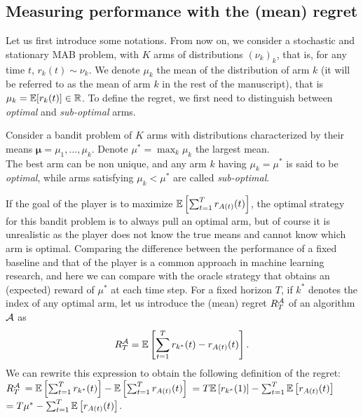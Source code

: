 \subsection{Measuring performance with the (mean) regret}

Let us first introduce some notations.
From now on, we consider a stochastic and stationary MAB problem, with $K$ arms of distributions $(\nu_k)_k$, that is, for any time $t$, $r_k(t)\sim \nu_k$.
We denote $\mu_k$ the mean of the distribution of arm $k$ (it will be referred to as the mean of arm $k$ in the rest of the manuscript), that is $\mu_k = \mathbb{E}[r_k(t)] \in \mathbb{R}$.
%
%
To define the regret, we first need to distinguish between \emph{optimal} and \emph{sub-optimal} arms.

\begin{defn}\label{def:2:optimalSubOptimalArms}
    Consider a bandit problem of $K$ arms with distributions characterized by their means $\bm{\mu}=\mu_1,\dots,\mu_k$.
    Denote $\mu^* = \max_k \mu_k$ the largest mean.\\
    The best arm can be non unique, and any arm $k$ having $\mu_k = \mu^*$ is said to be \emph{optimal},
    while arms satisfying $\mu_k < \mu^*$ are called \emph{sub-optimal}.
\end{defn}

If the goal of the player is to maximize $\mathbb{E}\left[\sum_{t=1}^T r_{A(t)}(t)\right]$,
the optimal strategy for this bandit problem is to always pull an optimal arm, but of course it is unrealistic as the player does not know the true means and cannot know which arm is optimal.
%
Comparing the difference between the performance of a fixed baseline and that of the player is a common approach in machine learning research,
and here we can compare with the oracle strategy that obtains an (expected) reward of $\mu^*$ at each time step.
%
For a fixed horizon $T$, if $k^*$ denotes the index of any optimal arm,
let us introduce the (mean) regret $R_T^{\mathcal{A}}$ of an algorithm $\mathcal{A}$ as
\[ R_T^{\mathcal{A}} = \mathbb{E}\left[ \sum_{t=1}^T r_{k^*}(t) - r_{A(t)}(t) \right]. \]
%
We can rewrite this expression to obtain the following definition of the regret:
$R_T^{\mathcal{A}}$
$= \mathbb{E}\left[ \sum_{t=1}^T r_{k^*}(t) \right] - \mathbb{E}\left[ \sum_{t=1}^T r_{A(t)}(t) \right]$
$= T \mathbb{E}\left[ r_{k^*}(1) \right] - \sum_{t=1}^T \mathbb{E}\left[ r_{A(t)}(t) \right]$
$= T \mu^* - \sum_{t=1}^T \mathbb{E}\left[ r_{A(t)}(t) \right]$.


